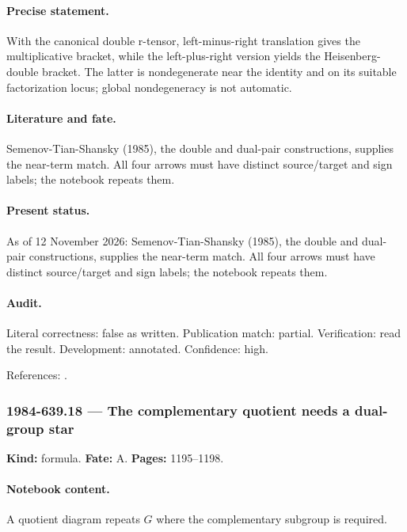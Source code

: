 \paragraph{Precise statement.} With the canonical double r-tensor, left-minus-right translation gives the multiplicative bracket, while the left-plus-right version yields the Heisenberg-double bracket. The latter is nondegenerate near the identity and on its suitable factorization locus; global nondegeneracy is not automatic.

\paragraph{Literature and fate.} Semenov-Tian-Shansky (1985), the double and dual-pair constructions, supplies the near-term match. All four arrows must have distinct source/target and sign labels; the notebook repeats them.

\paragraph{Present status.} As of 12 November 2026: Semenov-Tian-Shansky (1985), the double and dual-pair constructions, supplies the near-term match. All four arrows must have distinct source/target and sign labels; the notebook repeats them.

\paragraph{Audit.} Literal correctness: false as written. Publication match: partial. Verification: read the result. Development: annotated. Confidence: high.

\noindent References: \citep{semenov1985dressing}.\par

\subsubsection{1984-639.18 --- The complementary quotient needs a dual-group star}

\label{item:1984-639.18}

\noindent\textbf{Kind:} formula. \textbf{Fate:} A. \textbf{Pages:} 1195--1198.\par

\paragraph{Notebook content.} A quotient diagram repeats \(G\) where the complementary subgroup is required.

